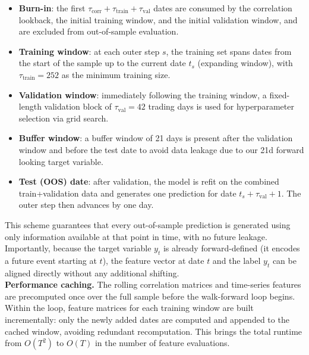 \documentclass{article}
\begin{document}
\begin{itemize}
    \item \textbf{Burn-in}: the first $\tau_{\text{corr}} + \tau_{\text{train}} + \tau_{\text{val}}$ dates are consumed by the correlation lookback, the initial training window, and the initial validation window, and are excluded from out-of-sample evaluation.
    \item \textbf{Training window}: at each outer step $s$, the training set spans dates from the start of the sample up to the current date $t_s$ (expanding window), with $\tau_{\text{train}} = 252$ as the minimum training size.
    \item \textbf{Validation window}: immediately following the training window, a fixed-length validation block of $\tau_{\text{val}} = 42$ trading days is used for hyperparameter selection via grid search.
    \item \textbf{Buffer window}: a buffer window of 21 days is present after the validation window and before the test date to avoid data leakage due to our 21d forward looking target variable.
    \item \textbf{Test (OOS) date}: after validation, the model is refit on the combined train+validation data and generates one prediction for date $t_s + \tau_{\text{val}} + 1$. The outer step then advances by one day.
\end{itemize}


This scheme guarantees that every out-of-sample prediction is generated using only information available at that point in time, with no future leakage. Importantly, because the target variable $y_t$ is already forward-defined (it encodes a future event starting at $t$), the feature vector at date $t$ and the label $y_t$ can be aligned directly without any additional shifting.\\

\noindent\textbf{Performance caching.} The rolling correlation matrices and time-series features are precomputed once over the full sample before the walk-forward loop begins. Within the loop, feature matrices for each training window are built incrementally: only the newly added dates are computed and appended to the cached window, avoiding redundant recomputation. This brings the total runtime from $O(T^2)$ to $O(T)$ in the number of feature evaluations.
\end{document}
